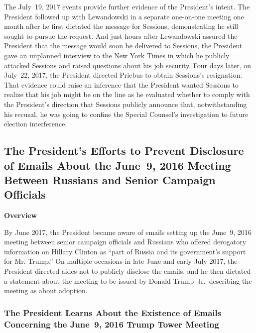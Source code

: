 The July~19, 2017 events provide further evidence of the President's intent.
The President followed up with Lewandowski in a separate one-on-one meeting one month after he first dictated the message for Sessions, demonstrating he still sought to pursue the request.
And just hours after Lewandowski assured the President that the message would soon be delivered to Sessions, the President gave an unplanned interview to the New York Times in which he publicly attacked Sessions and raised questions about his job security.
Four days later, on July~22, 2017, the President directed Priebus to obtain Sessions's resignation.
That evidence could raise an inference that the President wanted Sessions to realize that his job might be on the line as he evaluated whether to comply with the President's direction that Sessions publicly announce that, notwithstanding his recusal, he was going to confine the Special Counsel's investigation to future election interference.

\subsection{The President's Efforts to Prevent Disclosure of Emails About the June~9, 2016 Meeting Between Russians and Senior Campaign Officials}

\begin{center}
\textbf{Overview}
\end{center}

By June 2017, the President became aware of emails setting up the June~9, 2016 meeting between senior campaign officials and Russians who offered derogatory information on Hillary Clinton as ``part of Russia and its government's support for Mr. Trump.''
On multiple occasions in late June and early July 2017, the President directed aides not to publicly disclose the emails, and he then dictated a statement about the meeting to be issued by Donald Trump~Jr.\ describing the meeting as about adoption.

\subsubsection{The President Learns About the Existence of Emails Concerning the June~9, 2016 Trump Tower Meeting}

